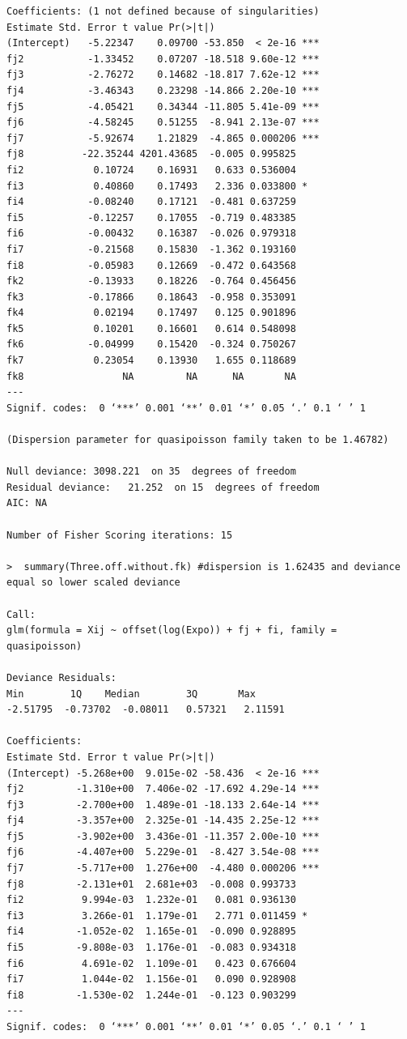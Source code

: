 \documentclass[11pt]{article}
\begin{document}
\begin{verbatim}
Coefficients: (1 not defined because of singularities)
Estimate Std. Error t value Pr(>|t|)    
(Intercept)   -5.22347    0.09700 -53.850  < 2e-16 ***
fj2           -1.33452    0.07207 -18.518 9.60e-12 ***
fj3           -2.76272    0.14682 -18.817 7.62e-12 ***
fj4           -3.46343    0.23298 -14.866 2.20e-10 ***
fj5           -4.05421    0.34344 -11.805 5.41e-09 ***
fj6           -4.58245    0.51255  -8.941 2.13e-07 ***
fj7           -5.92674    1.21829  -4.865 0.000206 ***
fj8          -22.35244 4201.43685  -0.005 0.995825    
fi2            0.10724    0.16931   0.633 0.536004    
fi3            0.40860    0.17493   2.336 0.033800 *  
fi4           -0.08240    0.17121  -0.481 0.637259    
fi5           -0.12257    0.17055  -0.719 0.483385    
fi6           -0.00432    0.16387  -0.026 0.979318    
fi7           -0.21568    0.15830  -1.362 0.193160    
fi8           -0.05983    0.12669  -0.472 0.643568    
fk2           -0.13933    0.18226  -0.764 0.456456    
fk3           -0.17866    0.18643  -0.958 0.353091    
fk4            0.02194    0.17497   0.125 0.901896    
fk5            0.10201    0.16601   0.614 0.548098    
fk6           -0.04999    0.15420  -0.324 0.750267    
fk7            0.23054    0.13930   1.655 0.118689    
fk8                 NA         NA      NA       NA    
---
Signif. codes:  0 ‘***’ 0.001 ‘**’ 0.01 ‘*’ 0.05 ‘.’ 0.1 ‘ ’ 1

(Dispersion parameter for quasipoisson family taken to be 1.46782)

Null deviance: 3098.221  on 35  degrees of freedom
Residual deviance:   21.252  on 15  degrees of freedom
AIC: NA

Number of Fisher Scoring iterations: 15

>  summary(Three.off.without.fk) #dispersion is 1.62435 and deviance equal so lower scaled deviance

Call:
glm(formula = Xij ~ offset(log(Expo)) + fj + fi, family = quasipoisson)

Deviance Residuals: 
Min        1Q    Median        3Q       Max  
-2.51795  -0.73702  -0.08011   0.57321   2.11591  

Coefficients:
Estimate Std. Error t value Pr(>|t|)    
(Intercept) -5.268e+00  9.015e-02 -58.436  < 2e-16 ***
fj2         -1.310e+00  7.406e-02 -17.692 4.29e-14 ***
fj3         -2.700e+00  1.489e-01 -18.133 2.64e-14 ***
fj4         -3.357e+00  2.325e-01 -14.435 2.25e-12 ***
fj5         -3.902e+00  3.436e-01 -11.357 2.00e-10 ***
fj6         -4.407e+00  5.229e-01  -8.427 3.54e-08 ***
fj7         -5.717e+00  1.276e+00  -4.480 0.000206 ***
fj8         -2.131e+01  2.681e+03  -0.008 0.993733    
fi2          9.994e-03  1.232e-01   0.081 0.936130    
fi3          3.266e-01  1.179e-01   2.771 0.011459 *  
fi4         -1.052e-02  1.165e-01  -0.090 0.928895    
fi5         -9.808e-03  1.176e-01  -0.083 0.934318    
fi6          4.691e-02  1.109e-01   0.423 0.676604    
fi7          1.044e-02  1.156e-01   0.090 0.928908    
fi8         -1.530e-02  1.244e-01  -0.123 0.903299    
---
Signif. codes:  0 ‘***’ 0.001 ‘**’ 0.01 ‘*’ 0.05 ‘.’ 0.1 ‘ ’ 1


\end{verbatim}
\end{document}
